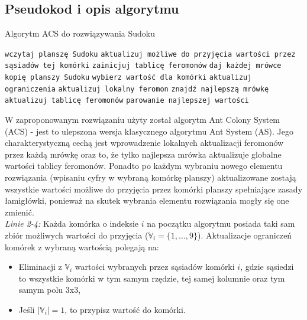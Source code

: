 \documentclass[11pt]{scrartcl} %
\begin{document}
\subsection{Pseudokod i opis algorytmu}
\begin{algorithm}
\caption{Algorytm ACS do rozwiązywania Sudoku}\label{alg:cap}
\begin{algorithmic}[1]
\State \texttt{wczytaj planszę Sudoku}
	\State \texttt{aktualizuj możliwe do przyjęcia wartości przez sąsiadów tej komórki}
\EndFor
\State \texttt{zainicjuj tablicę feromonów}
	\State \texttt{daj każdej mrówce kopię planszy Sudoku}
				\State \texttt{wybierz wartość dla komórki}
				\State \texttt{aktualizuj ograniczenia}
				\State \texttt{aktualizuj lokalny feromon}
			\EndIf
		\EndFor
	\EndFor
	\State \texttt{znajdź najlepszą mrówkę}
	\State \texttt{aktualizuj tablicę feromonów}
	\State \texttt{parowanie najlepszej wartości}
\EndWhile

\end{algorithmic}
\end{algorithm}

W zaproponowanym rozwiązaniu użyty został algorytm Ant Colony System (ACS) - jest to ulepszona wersja klasycznego algorytmu Ant System (AS). Jego charakterystyczną cechą jest wprowadzenie lokalnych aktualizacji feromonów przez każdą mrówkę oraz to, że tylko najlepsza mrówka aktualizuje globalne wartości tablicy feromonów. Ponadto po każdym wybraniu nowego elementu rozwiązania (wpisaniu cyfry w wybraną komórkę planszy) aktualizowane zostają wszystkie wartości możliwe do przyjęcia przez komórki planszy spełniające zasady łamigłówki, ponieważ na skutek wybrania elementu rozwiązania mogły się one zmienić.\\


\textit{Linie 2-4:} Każda komórka o indeksie $i$ na początku algorytmu posiada taki sam zbiór możliwych wartości do przyjęcia ($\mathbb{V}_i=\{1,...,9\}$). Aktualizacje ograniczeń komórek z wybraną wartością polegają na:
\begin{itemize}
	\item Eliminacji z $\mathbb{V}_i$ wartości wybranych przez sąsiadów komórki $i$, gdzie sąsiedzi to wszystkie komórki w tym samym rzędzie, tej samej kolumnie oraz tym samym polu 3x3, 
	\item Jeśli $|\mathbb{V}_i| = 1$, to przypisz wartość do komórki. 
\end{itemize}
\end{document}
